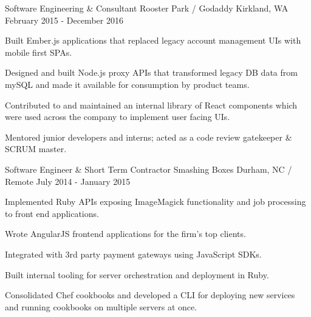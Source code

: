\begin{cventries}
  \cventry
    {Software Engineering \& Consultant} %
    {Rooster Park / Godaddy} %
    {Kirkland, WA} %
    {February 2015 - December 2016} %
    {
      \begin{cvitems} %
        \item {Built Ember.js applications that replaced legacy account management UIs with mobile first SPAs.}
        \item {Designed and built Node.js proxy APIs that transformed legacy DB data from mySQL and made it available for consumption by product teams.}
        \item {Contributed to and maintained an internal library of React components which were used across the company to implement user facing UIs.}
        \item {Mentored junior developers and interns; acted as a code review gatekeeper \& SCRUM master.}
      \end{cvitems}
    }

  \cventry
    {Software Engineer \& Short Term Contractor} %
    {Smashing Boxes} %
    {Durham, NC / Remote} %
    {July 2014 - January 2015} %
    {
      \begin{cvitems} %
        \item {Implemented Ruby APIs exposing ImageMagick functionality and job processing to front end applications.}
        \item {Wrote AngularJS frontend applications for the firm's top clients.}
        \item {Integrated with 3rd party payment gateways using JavaScript SDKs.}
        \item {Built internal tooling for server orchestration and deployment in Ruby.}
        \item {Consolidated Chef cookbooks and developed a CLI for deploying new services and running cookbooks on multiple servers at once.}
      \end{cvitems}
    }



\end{cventries}
